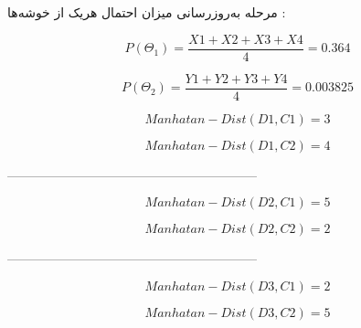 \begin{boxK}
    مرحله به‌روزرسانی میزان احتمال هریک از خوشه‌ها : 
    
    \begin{equation*}
        P(\Theta_{1}) = \frac{X1 + X2 + X3 + X4}{4} = 0.364
    \end{equation*}

    \begin{equation*}
        P(\Theta_{2}) = \frac{Y1 + Y2 + Y3 + Y4}{4} = 0.003825
    \end{equation*}
\end{boxK}

\begin{boxD}
    \begin{equation*}
        Manhatan-Dist(D1 , C1) = 3
    \end{equation*}

    \begin{equation*}
        Manhatan-Dist(D1 , C2) = 4
    \end{equation*}

    \begin{center}
    \color{red}
    \end{center}

-----------------------------------------------------------

    \begin{equation*}
        Manhatan-Dist(D2 , C1) = 5
    \end{equation*}

    \begin{equation*}
        Manhatan-Dist(D2 , C2) = 2
    \end{equation*}

    \begin{center}
    \color{red}
    \end{center}

-----------------------------------------------------------

    \begin{equation*}
        Manhatan-Dist(D3 , C1) = 2
    \end{equation*}

    \begin{equation*}
        Manhatan-Dist(D3 , C2) = 5
    \end{equation*}

    \begin{center}
    \color{red}
    \end{center}
    

\end{boxD}
